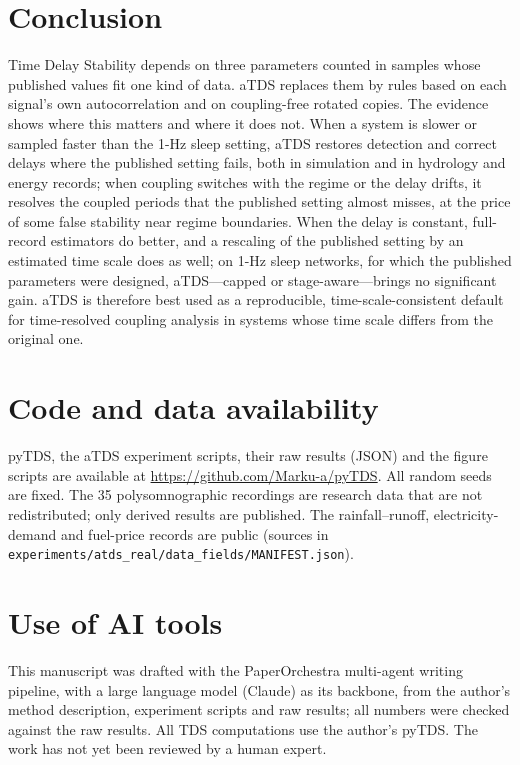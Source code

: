 \documentclass[11pt,a4paper]{article}
\begin{document}
\section{Conclusion}
\label{sec:conclusion}
Time Delay Stability depends on three parameters counted in samples whose published values fit one kind of data. aTDS replaces them by rules based on each signal's own autocorrelation and on coupling-free rotated copies. The evidence shows where this matters and where it does not. When a system is slower or sampled faster than the 1-Hz sleep setting, aTDS restores detection and correct delays where the published setting fails, both in simulation and in hydrology and energy records; when coupling switches with the regime or the delay drifts, it resolves the coupled periods that the published setting almost misses, at the price of some false stability near regime boundaries. When the delay is constant, full-record estimators do better, and a rescaling of the published setting by an estimated time scale does as well; on 1-Hz sleep networks, for which the published parameters were designed, aTDS---capped or stage-aware---brings no significant gain. aTDS is therefore best used as a reproducible, time-scale-consistent default for time-resolved coupling analysis in systems whose time scale differs from the original one.

\section*{Code and data availability}
pyTDS, the aTDS experiment scripts, their raw results (JSON) and the figure scripts are available at \url{https://github.com/Marku-a/pyTDS}. All random seeds are fixed. The 35 polysomnographic recordings are research data that are not redistributed; only derived results are published. The rainfall--runoff, electricity-demand and fuel-price records are public (sources in \texttt{experiments/atds\_real/data\_fields/MANIFEST.json}).

\section*{Use of AI tools}
This manuscript was drafted with the PaperOrchestra multi-agent writing pipeline, with a large language model (Claude) as its backbone, from the author's method description, experiment scripts and raw results; all numbers were checked against the raw results. All TDS computations use the author's pyTDS. The work has not yet been reviewed by a human expert.




\end{document}
